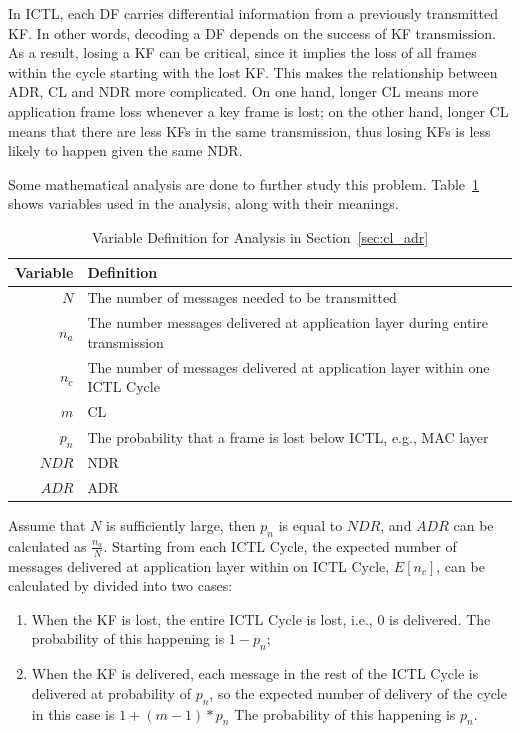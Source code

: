 \documentclass[12pt]{report}
\begin{document}
In ICTL, each DF carries differential information from a previously transmitted KF. In other words, decoding a DF depends on the success of KF transmission. As a result, losing a KF can be critical, since it implies the loss of all frames within the cycle starting with the lost KF. This makes the relationship between ADR, CL and NDR more complicated. On one hand, longer CL means more application frame loss whenever a key frame is lost; on the other hand, longer CL means that there are less KFs in the same transmission, thus losing KFs is less likely to happen given the same NDR.

Some mathematical analysis are done to further study this problem. Table~\ref{tab:cl_var} shows variables used in the analysis, along with their meanings.

\begin{table}
  \begin{center}
    \begin{tabular}{r l}
      \hline
      Variable & Definition \\ \hline
      $N$      & The number of messages needed to be transmitted \\
      $n_a$    & The number messages delivered at application layer during entire transmission \\
      $n_c$ & The number of messages delivered at application layer within one ICTL Cycle \\ 
      $m$      & CL \\
      $p_n$    & The probability that a frame is lost below ICTL, e.g., MAC layer \\
      $NDR$    & NDR \\
      $ADR$    & ADR \\
      \hline
    \end{tabular}
    \caption{\label{tab:cl_var}Variable Definition for Analysis in Section~\ref{sec:cl_adr}}
  \end{center}
\end{table}

Assume that $N$ is sufficiently large, then $p_n$ is equal to $NDR$, and $ADR$ can be calculated as $\frac{n_a}{N}$. Starting from each ICTL Cycle, the expected number of messages delivered at application layer within on ICTL Cycle, $E[n_c]$, can be calculated by divided into two cases:
\begin{enumerate}
  \item When the KF is lost, the entire ICTL Cycle is lost, i.e., 0 is delivered. The probability of this happening is $1-p_n$;
  \item When the KF is delivered, each message in the rest of the ICTL Cycle is delivered at probability of $p_n$, so the expected number of delivery of the cycle in this case is $1+(m-1)*p_n$ The probability of this happening is $p_n$.
\end{enumerate}
\end{document}
